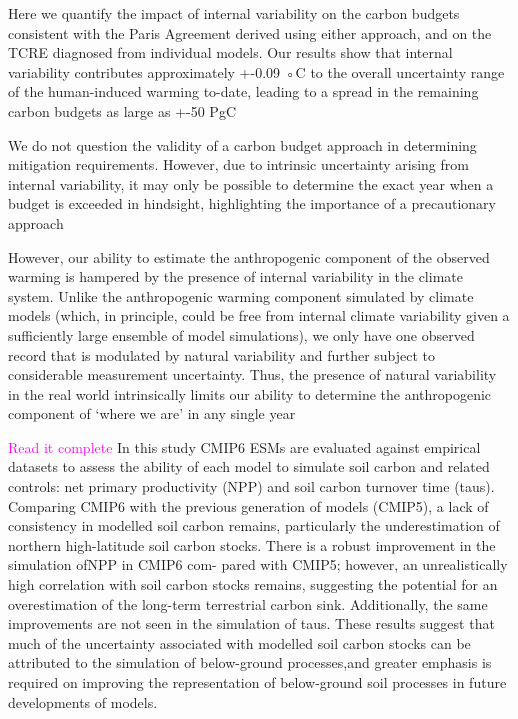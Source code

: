 \documentclass{article}
\begin{document}
\citep{Tokarska2020}

Here we quantify the impact of internal variability on the carbon budgets consistent with the Paris Agreement derived using either approach, and on the TCRE diagnosed from individual models. Our results show that internal variability contributes approximately +-0.09 ◦C to the overall uncertainty range of the human-induced warming to-date, leading to a spread in the remaining carbon budgets as large as +-50 PgC

We do not question the validity of a carbon budget approach in determining mitigation requirements. However, due to intrinsic uncertainty arising from internal variability, it may only be possible to determine the exact year when a budget is exceeded in hindsight, highlighting the importance of a precautionary approach

However, our ability to estimate the anthropogenic component of the observed warming is hampered by the presence of internal variability in the climate system. Unlike the anthropogenic warming component simulated by climate models (which, in principle, could be free from internal climate variability given a sufficiently large ensemble of model simulations), we only have one observed record that is modulated by natural variability and further subject to considerable measurement uncertainty. Thus, the presence of natural variability in the real world intrinsically limits our ability to determine the anthropogenic component of ‘where we are’ in any single year


\citep{Varney2022}
\textcolor{magenta}{Read it complete}
In this study CMIP6 ESMs are evaluated against empirical datasets to assess the ability of each model to simulate soil carbon and related controls: net primary productivity (NPP) and soil carbon turnover time (taus). Comparing CMIP6 with the previous generation of models (CMIP5), a lack of consistency in modelled soil carbon remains, particularly the underestimation of northern high-latitude soil carbon stocks. There is a robust improvement in the simulation ofNPP in CMIP6 com-
pared with CMIP5; however, an unrealistically high correlation with soil carbon stocks remains, suggesting the potential for an overestimation of the long-term terrestrial carbon sink. Additionally, the same improvements are not seen in
the simulation of taus. These results suggest that much of the uncertainty associated with modelled soil carbon stocks can be attributed to the simulation of below-ground processes,and greater emphasis is required on improving the representation of below-ground soil processes in future developments of models.
\end{document}
